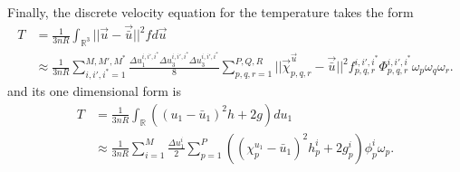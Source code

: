 %
Finally, the discrete velocity equation for the temperature takes the form
%
\begin{align*}
T &= \frac{1}{3 n R} \int_{\mathbb{R}^3} ||\vec{u} - \vec{\bar{u}}||^2 f d \vec{u}\\
&\approx \frac{1}{3 n R} \sum_{i,i',i^*=1}^{M,M',M^*} \frac{\Delta u_1^{i,i',i^*} \Delta u_3^{i,i',i^*} \Delta u_3^{i,i',i^*}}{8} \sum_{p,q,r=1}^{P,Q,R} ||\vec{\chi}_{p,q,r}^{\vec{u}} - \vec{\bar{u}}||^2 f_{p,q,r}^{i,i',i^*} \Phi_{p,q,r}^{i,i',i^*} \omega_p \omega_q \omega_r.
\end{align*}
%
and its one dimensional form is
%
\begin{align*}
T &= \frac{1}{3 n R} \int_{\mathbb{R}} ((u_1 - \bar{u}_1)^2 h + 2g) du_1\\
&\approx \frac{1}{3 n R} \sum_{i=1}^M \frac{\Delta u_1^i}{2} \sum_{p=1}^P ((\chi_p^{u_1} - \bar{u}_1)^2 h_{p}^{i} + 2 g_{p}^{i}) \phi_{p}^{i} \omega_p.
\end{align*}
